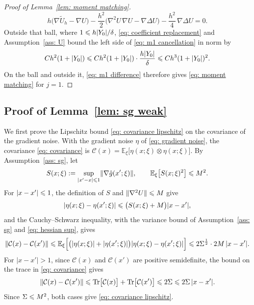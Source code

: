 \begin{proof}[Proof of Lemma~\ref{lem: moment matching}]
    \begin{equation}
        h \bigl( \nabla \tilde U_h - \nabla U \bigr) - \frac{h^2}{2} \bigl( \nabla^2 U\, \nabla U - \nabla \Delta U \bigr) - \frac{h^2}{4}\, \nabla \Delta U = 0 .
        \label{eq: m1 cancellation}
    \end{equation}
    Outside that ball, where $1 \leqslant h|Y_0|/\delta$, \eqref{eq: coefficient replacement} and Assumption~\ref{ass: U} bound the left side of \eqref{eq: m1 cancellation} in norm by
    \begin{equation*}
        C h^2 (1+|Y_0|) \leqslant C h^2 (1+|Y_0|) \cdot \frac{h |Y_0|}{\delta} \leqslant C h^3 (1+|Y_0|)^2 .
    \end{equation*}
    On the ball and outside it, \eqref{eq: m1 difference} therefore gives \eqref{eq: moment matching} for $j = 1$.
\end{proof}

\subsection{Proof of Lemma~\ref{lem: sg weak}}
\label{sec: sg weak proof}

We first prove the Lipschitz bound \eqref{eq: covariance lipschitz} on the covariance of the gradient noise. With the gradient noise $\eta$ of \eqref{eq: gradient noise}, the covariance \eqref{eq: covariance} is $\mathcal C(x) = \mathbb E_\xi\bigl[ \eta(x;\xi) \otimes \eta(x;\xi) \bigr]$. By Assumption~\ref{ass: sg}, let
\begin{equation}
    S(x;\xi) := \sup_{|x'-x| \leqslant 1} \lVert \nabla \hat g(x';\xi) \rVert , \qquad \mathbb E_\xi \big[S(x;\xi)^2 \big] \leqslant M^2 .
    \label{eq: hessian sup}
\end{equation}
For $|x - x'| \leqslant 1$, the definition of $S$ and $\lVert \nabla^2 U \rVert \leqslant M$ give
\begin{equation*}
    |\eta(x;\xi) - \eta(x';\xi)| \leqslant \bigl( S(x;\xi) + M \bigr) |x - x'| ,
\end{equation*}
and the Cauchy--Schwarz inequality, with the variance bound of Assumption~\ref{ass: sg} and \eqref{eq: hessian sup}, gives
\begin{equation*}
    \lVert \mathcal C(x) - \mathcal C(x') \rVert \leqslant \mathbb E_\xi\Bigl[ \bigl( |\eta(x;\xi)| + |\eta(x';\xi)| \bigr) |\eta(x;\xi) - \eta(x';\xi)| \Bigr] \leqslant 2\Sigma^{\frac12} \cdot 2M\, |x - x'| .
\end{equation*}
For $|x - x'| > 1$, since $\mathcal C(x)$ and $\mathcal C(x')$ are positive semidefinite, the bound on the trace in \eqref{eq: covariance} gives
\begin{equation*}
    \lVert \mathcal C(x) - \mathcal C(x') \rVert \leqslant \mathrm{Tr}\bigl[ \mathcal C(x) \bigr] + \mathrm{Tr}\bigl[ \mathcal C(x') \bigr] \leqslant 2\Sigma \leqslant 2\Sigma\, |x - x'| .
\end{equation*}
Since $\Sigma \leqslant M^2$, both cases give \eqref{eq: covariance lipschitz}.

